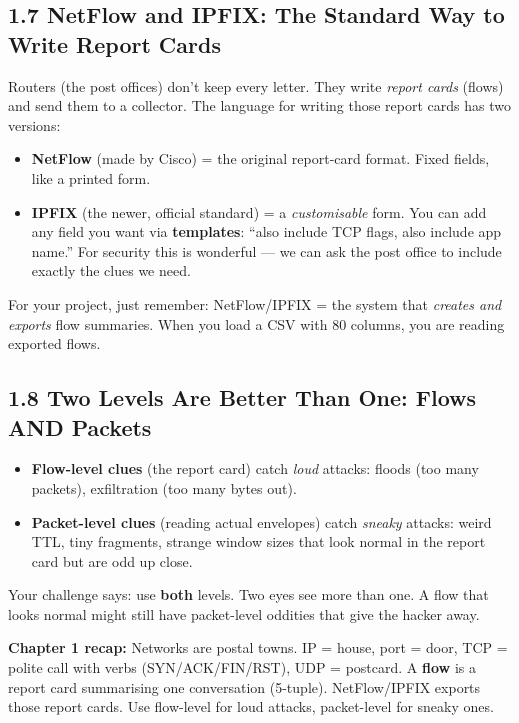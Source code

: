 \documentclass[11pt,a4paper]{article}
\begin{document}
\subsection{1.7 NetFlow and IPFIX: The Standard Way to Write Report Cards}
\label{sec:ipfix}

Routers (the post offices) don't keep every letter. They write \emph{report
cards} (flows) and send them to a collector. The language for writing those
report cards has two versions:

\begin{itemize}[leftmargin=1.6em,itemsep=2pt]
  \item \textbf{NetFlow} (made by Cisco) = the original report-card format.
        Fixed fields, like a printed form.
  \item \textbf{IPFIX} (the newer, official standard) = a \emph{customisable}
        form. You can add any field you want via \textbf{templates}: ``also
        include TCP flags, also include app name.'' For security this is
        wonderful --- we can ask the post office to include exactly the clues
        we need.
\end{itemize}

For your project, just remember: NetFlow/IPFIX = the system that \emph{creates
and exports} flow summaries. When you load a CSV with 80 columns, you are
reading exported flows.

\subsection{1.8 Two Levels Are Better Than One: Flows AND Packets}
\label{sec:levels}

\begin{itemize}[leftmargin=1.6em,itemsep=2pt]
  \item \textbf{Flow-level clues} (the report card) catch \emph{loud} attacks:
        floods (too many packets), exfiltration (too many bytes out).
  \item \textbf{Packet-level clues} (reading actual envelopes) catch
        \emph{sneaky} attacks: weird TTL, tiny fragments, strange window sizes
        that look normal in the report card but are odd up close.
\end{itemize}

Your challenge says: use \textbf{both} levels. Two eyes see more than one.
A flow that looks normal might still have packet-level oddities that give the
hacker away.

\begin{recap}
\textbf{Chapter 1 recap:} Networks are postal towns. IP = house, port = door,
TCP = polite call with verbs (SYN/ACK/FIN/RST), UDP = postcard. A \textbf{flow}
is a report card summarising one conversation (5-tuple). NetFlow/IPFIX exports
those report cards. Use flow-level for loud attacks, packet-level for sneaky
ones.
\end{recap}
\end{document}
